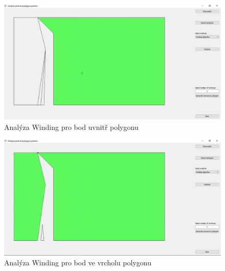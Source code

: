 \documentclass[a4paper,11pt,twoside]{article}
\begin{document}
\vspace{0.2cm}
\begin{figure}[hbt!] 
\begin{center}
\includegraphics[width=15cm]{pictures/windinside.png} 
\caption[Analýza Winding pro bod uvnitř polygonu]{Analýza Winding pro bod uvnitř polygonu}
\label{fig:windinside}
\end{center}
\end{figure}

\vspace{0.2cm}
\begin{figure}[hbt!] 
\begin{center}
\includegraphics[width=15cm]{pictures/windonpoint.png} 
\caption[Analýza Winding pro bod ve vrcholu polygonu]{Analýza Winding pro bod ve vrcholu polygonu}
\label{fig:windonpoint}
\end{center}
\end{figure}
\end{document}
